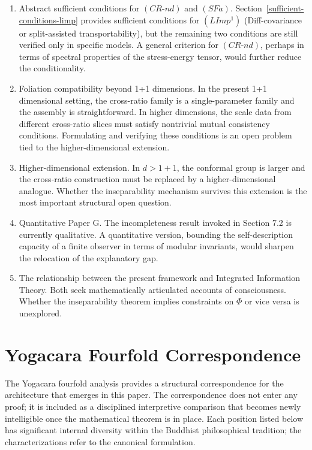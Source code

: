 \documentclass[12pt]{article}
\theoremstyle{definition}
\theoremstyle{remark}
\begin{document}
\begin{enumerate}
\def\labelenumi{\arabic{enumi}.}
\item
  Abstract sufficient conditions for \((CR\text{-}nd)\)
  and \((SFa)\). Section~\ref{sufficient-conditions-limp} provides sufficient conditions for \((LImp^1)\) (Diff-covariance or split-assisted transportability), but the remaining two conditions are still verified only in specific models. A general criterion for \((CR\text{-}nd)\), perhaps in terms of spectral properties of the stress-energy tensor, would further reduce the conditionality.
\item
  Foliation compatibility beyond 1+1 dimensions. In the present 1+1
  dimensional setting, the cross-ratio family is a single-parameter
  family and the assembly is straightforward. In higher dimensions, the
  scale data from different cross-ratio slices must satisfy nontrivial
  mutual consistency conditions. Formulating and verifying these
  conditions is an open problem tied to the higher-dimensional
  extension.
\item
  Higher-dimensional extension. In \(d > 1+1\), the conformal group is
  larger and the cross-ratio construction must be replaced by a
  higher-dimensional analogue. Whether the inseparability mechanism
  survives this extension is the most important structural open
  question.
\item
  Quantitative Paper G. The incompleteness result invoked in Section 7.2
  is currently qualitative. A quantitative version, bounding the
  self-description capacity of a finite observer in terms of modular
  invariants, would sharpen the relocation of the explanatory gap.
\item
  The relationship between the present framework and Integrated
  Information Theory. Both seek mathematically articulated accounts of
  consciousness. Whether the inseparability theorem implies constraints
  on \(\Phi\) or vice versa is unexplored.
\end{enumerate}

\appendix

\section{Yogacara Fourfold Correspondence}\label{app:yogacara}

The Yogacara fourfold analysis provides a structural correspondence for
the architecture that emerges in this paper. The correspondence does not
enter any proof; it is included as a disciplined interpretive comparison
that becomes newly intelligible once the mathematical theorem is in
place. Each position listed below has significant internal diversity
within the Buddhist philosophical tradition; the characterizations refer
to the canonical formulation.
\end{document}
